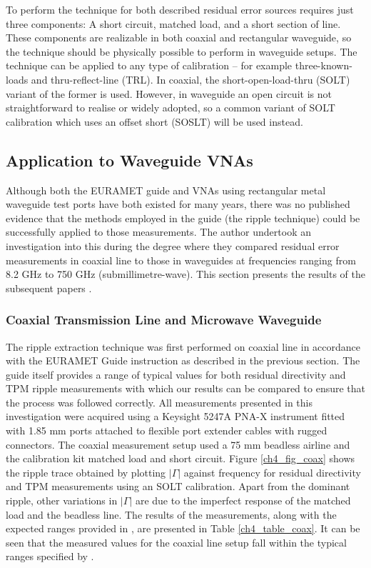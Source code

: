 \documentclass[../thesis/thesis.tex]{subfiles}
\begin{document}
To perform the technique for both described residual error sources requires just three components: A short circuit, matched load, and a short section of line. These components are realizable in both coaxial and rectangular waveguide, so the technique should be physically possible to perform in waveguide setups. The technique can be applied to any type of calibration – for example three-known-loads and thru-reflect-line (TRL). In coaxial, the short-open-load-thru (SOLT) variant of the former is used. However, in waveguide an open circuit is not straightforward to realise or widely adopted, so a common variant of SOLT calibration which uses an offset short (SOSLT) will be used instead.

\subsection{Application to Waveguide VNAs}

Although both the EURAMET guide and VNAs using rectangular metal waveguide test ports have both existed for many years, there was no published evidence that the methods employed in the guide (the ripple technique) could be successfully applied to those measurements. The author undertook an investigation into this during the degree where they compared residual error measurements in coaxial line to those in waveguides at frequencies ranging from 8.2 GHz to 750 GHz (submillimetre-wave). This section presents the results of the subsequent papers \cite{Stant_2016_Coll, Stant_2017}.

\subsubsection{Coaxial Transmission Line and Microwave Waveguide}

The ripple extraction technique was first performed on coaxial line in accordance with the EURAMET Guide \cite{EURAMET_2011} instruction as described in the previous section. The guide itself provides a range of typical values for both residual directivity and TPM ripple measurements with which our results can be compared to ensure that the process was followed correctly. All measurements presented in this investigation were acquired using a Keysight 5247A PNA-X instrument fitted with 1.85 mm ports attached to flexible port extender cables with rugged connectors. The coaxial measurement setup used a 75 mm beadless airline and the calibration kit matched load and short circuit. Figure \ref{ch4_fig_coax} shows the ripple trace obtained by plotting $|\Gamma|$ against frequency for residual directivity and TPM measurements using an SOLT calibration. Apart from the dominant ripple, other variations in $|\Gamma|$ are due to the imperfect response of the matched load and the beadless line. The results of the measurements, along with the expected ranges provided in \cite{EURAMET_2011}, are presented in Table \ref{ch4_table_coax}. It can be seen that the measured values for the coaxial line setup fall within the typical ranges specified by \cite{EURAMET_2011}.
\end{document}
